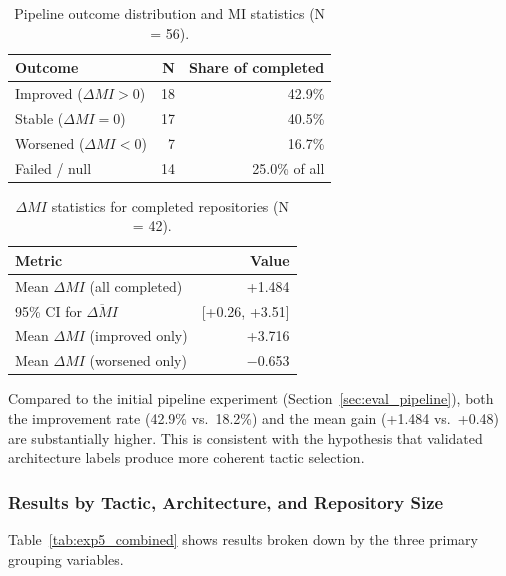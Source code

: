 \begin{table}[H]
\centering
\small
\caption{Pipeline outcome distribution and MI statistics (N = 56).}
\label{tab:exp5_outcomes}
\begin{tabular}{lrr}
\toprule
\textbf{Outcome} & \textbf{N} & \textbf{Share of completed} \\
\midrule
Improved ($\Delta MI > 0$)  & 18 & 42.9\% \\
Stable ($\Delta MI = 0$)    & 17 & 40.5\% \\
Worsened ($\Delta MI < 0$)  & 7  & 16.7\% \\
Failed / null               & 14 & 25.0\% of all \\
\bottomrule
\end{tabular}
\end{table}

\begin{table}[H]
\centering
\small
\caption{$\Delta MI$ statistics for completed repositories (N = 42).}
\label{tab:exp5_all}
\begin{tabular}{lr}
\toprule
\textbf{Metric} & \textbf{Value} \\
\midrule
Mean $\Delta MI$ (all completed)  & +1.484 \\
95\% CI for $\overline{\Delta MI}$ & [+0.26, +3.51] \\
Mean $\Delta MI$ (improved only)  & +3.716 \\
Mean $\Delta MI$ (worsened only)  & $-$0.653 \\
\bottomrule
\end{tabular}
\end{table}

Compared to the initial pipeline experiment (Section~\ref{sec:eval_pipeline}), both the improvement rate (42.9\% vs.\ 18.2\%) and the mean gain (+1.484 vs.\ +0.48) are substantially higher. This is consistent with the hypothesis that validated architecture labels produce more coherent tactic selection.

\subsubsection*{Results by Tactic, Architecture, and Repository Size}

Table~\ref{tab:exp5_combined} shows results broken down by the three primary grouping variables.

